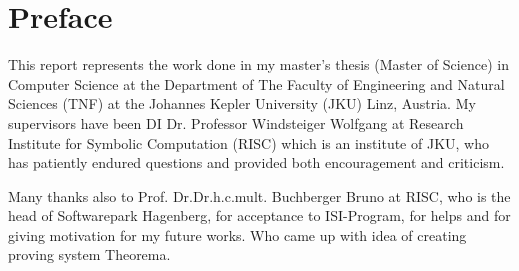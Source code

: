 \chapter*{Preface}
This report represents the work done in my master's thesis (Master of
Science) in Computer Science at the Department of The Faculty of 
Engineering and Natural Sciences (TNF) at the Johannes Kepler University (JKU) 
Linz, Austria. My supervisors have been DI Dr. Professor Windsteiger Wolfgang 
at Research Institute for Symbolic Computation (RISC) which is an institute of 
JKU, who has patiently endured questions and provided both encouragement and criticism.
	

Many thanks also to Prof. Dr.Dr.h.c.mult. Buchberger Bruno at RISC, who is the 
head of Softwarepark Hagenberg, for acceptance to ISI-Program, for helps and 
for giving motivation for my future works. Who came up with idea of creating 
proving system Theorema.
\newpage